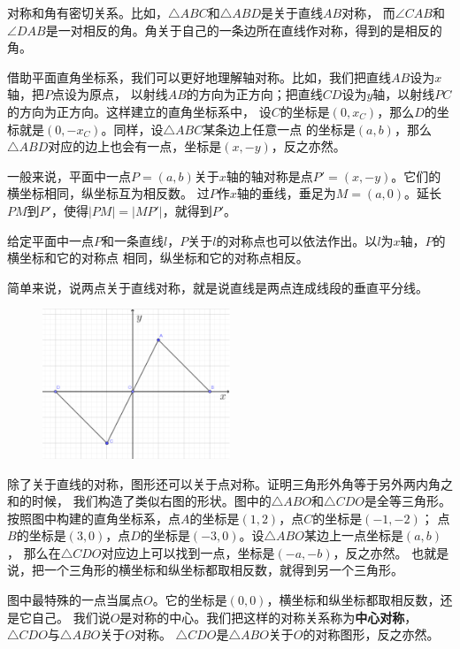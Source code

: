 \documentclass[12pt,UTF8]{ctexbook}
\begin{document}
对称和角有密切关系。比如，$\triangle ABC$和$\triangle ABD$是关于直线$AB$对称，
而$\angle CAB$和$\angle DAB$是一对相反的角。角关于自己的一条边所在直线作对称，得到的是相反的角。

借助平面直角坐标系，我们可以更好地理解轴对称。比如，我们把直线$AB$设为$x$轴，把$P$点设为原点，
以射线$AB$的方向为正方向；把直线$CD$设为$y$轴，以射线$PC$的方向为正方向。这样建立的直角坐标系中，
设$C$的坐标是$(0, x_C)$，那么$D$的坐标就是$(0, -x_C)$。同样，设$\triangle ABC$某条边上任意一点
的坐标是$(a, b)$，那么$\triangle ABD$对应的边上也会有一点，坐标是$(x, -y)$，反之亦然。

一般来说，平面中一点$P = (a, b)$关于$x$轴的轴对称是点$P' = (x, -y)$。它们的横坐标相同，纵坐标互为相反数。
过$P$作$x$轴的垂线，垂足为$M = (a,0)$。延长$PM$到$P'$，使得$|PM| = |MP'|$，就得到$P'$。

给定平面中一点$P$和一条直线$l$，$P$关于$l$的对称点也可以依法作出。以$l$为$x$轴，$P$的横坐标和它的对称点
相同，纵坐标和它的对称点相反。

简单来说，说两点关于直线对称，就是说直线是两点连成线段的垂直平分线。

\begin{figure} %
    \vspace{-15pt}
    \centering
    \includegraphics[width=0.5\textwidth]{tu/轴对称1.png}
\end{figure}

除了关于直线的对称，图形还可以关于点对称。证明三角形外角等于另外两内角之和的时候，
我们构造了类似右图的形状。图中的$\triangle ABO$和$\triangle CDO$是全等三角形。
按照图中构建的直角坐标系，点$A$的坐标是$(1,2)$，点$C$的坐标是$(-1, -2)$；
点$B$的坐标是$(3,0)$，点$D$的坐标是$(-3, 0)$。设$\triangle ABO$某边上一点坐标是$(a, b)$，
那么在$\triangle CDO$对应边上可以找到一点，坐标是$(-a, -b)$，反之亦然。
也就是说，把一个三角形的横坐标和纵坐标都取相反数，就得到另一个三角形。

图中最特殊的一点当属点$O$。它的坐标是$(0,0)$，横坐标和纵坐标都取相反数，还是它自己。
我们说$O$是对称的中心。我们把这样的对称关系称为\textbf{中心对称}，$\triangle CDO$与$\triangle ABO$关于$O$对称。
$\triangle CDO$是$\triangle ABO$关于$O$的对称图形，反之亦然。
\end{document}
